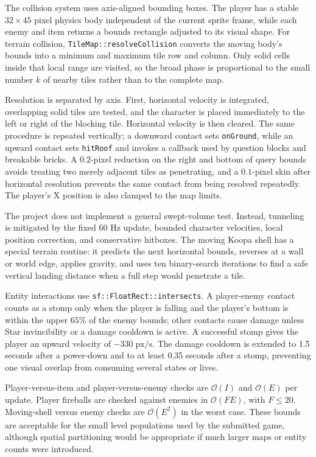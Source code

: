 \documentclass{template}
\begin{document}
The collision system uses axis-aligned bounding boxes. The player has a stable
$32\times45$ pixel physics body independent of the current sprite frame, while
each enemy and item returns a bounds rectangle adjusted to its visual shape.
For terrain collision, \texttt{TileMap::resolveCollision} converts the moving
body's bounds into a minimum and maximum tile row and column. Only solid cells
inside that local range are visited, so the broad phase is proportional to the
small number $k$ of nearby tiles rather than to the complete map.

Resolution is separated by axis. First, horizontal velocity is integrated,
overlapping solid tiles are tested, and the character is placed immediately to
the left or right of the blocking tile. Horizontal velocity is then cleared.
The same procedure is repeated vertically; a downward contact sets
\texttt{onGround}, while an upward contact sets \texttt{hitRoof} and invokes a
callback used by question blocks and breakable bricks. A $0.2$-pixel reduction
on the right and bottom of query bounds avoids treating two merely adjacent
tiles as penetrating, and a $0.1$-pixel skin after horizontal resolution
prevents the same contact from being resolved repeatedly. The player's X
position is also clamped to the map limits.

The project does not implement a general swept-volume test. Instead, tunneling
is mitigated by the fixed $60$ Hz update, bounded character velocities, local
position correction, and conservative hitboxes. The moving Koopa shell has a
special terrain routine: it predicts the next horizontal bounds, reverses at a
wall or world edge, applies gravity, and uses ten binary-search iterations to
find a safe vertical landing distance when a full step would penetrate a
tile.

Entity interactions use \texttt{sf::FloatRect::intersects}. A player-enemy
contact counts as a stomp only when the player is falling and the player's
bottom is within the upper $65\%$ of the enemy bounds; other contacts cause
damage unless Star invincibility or a damage cooldown is active. A successful
stomp gives the player an upward velocity of $-330\;\mathrm{px/s}$. The damage
cooldown is extended to 1.5 seconds after a power-down and to at least 0.35
seconds after a stomp, preventing one visual overlap from consuming several
states or lives.

Player-versus-item and player-versus-enemy checks are $\mathcal{O}(I)$ and
$\mathcal{O}(E)$ per update. Player fireballs are checked against enemies in
$\mathcal{O}(FE)$, with $F\leq20$. Moving-shell versus enemy checks are
$\mathcal{O}(E^2)$ in the worst case. These bounds are acceptable for the
small level populations used by the submitted game, although spatial
partitioning would be appropriate if much larger maps or entity counts were
introduced.
\end{document}
